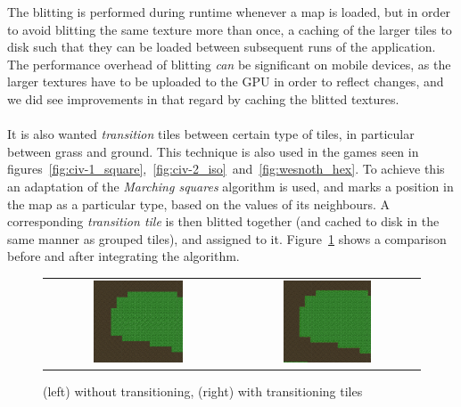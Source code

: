 The blitting is performed during runtime whenever a map is loaded, but in order to avoid blitting the same texture more than once, a caching of the larger tiles to disk such that they can be loaded between subsequent runs of the application. 
The performance overhead of blitting \textit{can} be significant on mobile devices, as the larger textures have to be uploaded to the GPU in order to reflect changes, and we did see improvements in that regard by caching the blitted textures.
\\
\\
It is also wanted \textit{transition} tiles between certain type of tiles, in particular between grass and ground.
This technique is also used in the games seen in figures~\ref{fig:civ-1_square},~\ref{fig:civ-2_iso}~and~\ref{fig:wesnoth_hex}.
To achieve this an adaptation of the \textit{Marching squares} algorithm is used, and marks a position in the map as a particular type, based on the values  of its neighbours. 
A corresponding \textit{transition tile} is then blitted together (and cached to disk in the same manner as grouped tiles), and assigned to it.
Figure~\ref{fig:transition_comparison} shows a comparison before and after integrating the algorithm.

\begin{figure}[H]
    \centering
    \begin{tabular}{cc}
        \includegraphics[width=0.5\textwidth]{figures/generating_levels/no_transition.png}
        &
        \includegraphics[width=0.5\textwidth]{figures/generating_levels/with_transition.png}
    \end{tabular}
    \caption{(left) without transitioning, (right) with transitioning tiles}\label{fig:transition_comparison}
\end{figure}

